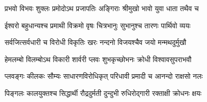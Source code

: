 \label{app:samvatsara_names}

\twolineshloka
{प्रभवो विभवः शुक्लः प्रमोदोऽथ प्रजापतिः}
{अङ्गिराः श्रीमुखो भावो युवा धाता तथैव च}

\twolineshloka
{ईश्वरो बहुधान्यश्च प्रमाथी विक्रमो वृषः}
{चित्रभानुः सुभानुश्च तारणः पार्थिवो व्ययः}

\twolineshloka
{सर्वजित्सर्वधारी च विरोधी विकृतिः खरः}
{नन्दनो विजयश्चैव जयो मन्मथदुर्मुखौ}

\twolineshloka
{हेमलम्बो विलम्बोऽथ विकारी शार्वरी प्लवः}
{शुभकृच्छोभनः क्रोधी विश्वावसुपराभवौ}

\twolineshloka
{प्लवङ्गः कीलकः सौम्यः साधारणविरोधिकृत्}
{परिधावी प्रमादी च आनन्दो राक्षसो नलः}

\twolineshloka
{पिङ्गलः कालयुक्तश्च सिद्धार्थी रौद्रदुर्मती}
{दुन्दुभी रुधिरोद्गारी रक्ताक्षी क्रोधनः क्षयः}


